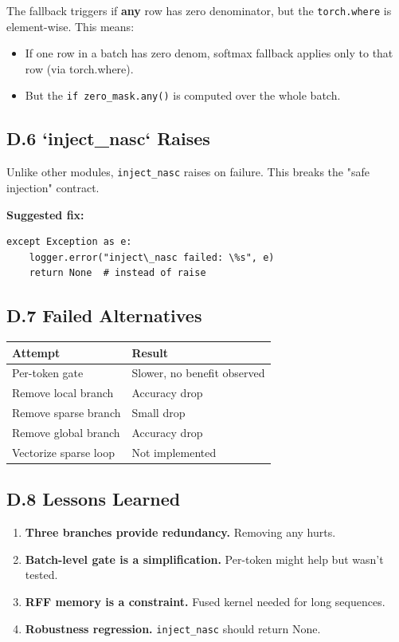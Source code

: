 The fallback triggers if \textbf{any} row has zero denominator, but the 
\texttt{torch.where} is element-wise. This means:
\begin{itemize}
\item If one row in a batch has zero denom, softmax fallback applies only to
  that row (via torch.where).
\item But the \texttt{if zero\_mask.any()} is computed over the whole batch.

\end{itemize}
\subsection{D.6 `inject\_nasc` Raises}

Unlike other modules, \texttt{inject\_nasc} raises on failure. This breaks the 
"safe injection" contract.

\textbf{Suggested fix:}

\begin{lstlisting}
except Exception as e:
    logger.error("inject\_nasc failed: \%s", e)
    return None  # instead of raise
\end{lstlisting}

\subsection{D.7 Failed Alternatives}

\begin{table}[H]
\centering
\small
\begin{tabular}{ll}
\toprule
\textbf{Attempt} & \textbf{Result} \\
\midrule
Per-token gate & Slower, no benefit observed \\
Remove local branch & Accuracy drop \\
Remove sparse branch & Small drop \\
Remove global branch & Accuracy drop \\
Vectorize sparse loop & Not implemented \\
\bottomrule
\end{tabular}
\end{table}

\subsection{D.8 Lessons Learned}

\begin{enumerate}
\item \textbf{Three branches provide redundancy.} Removing any hurts.
\item \textbf{Batch-level gate is a simplification.} Per-token might help but
  wasn't tested.
\item \textbf{RFF memory is a constraint.} Fused kernel needed for long sequences.
\item \textbf{Robustness regression.} \texttt{inject\_nasc} should return None.

\end{enumerate}
